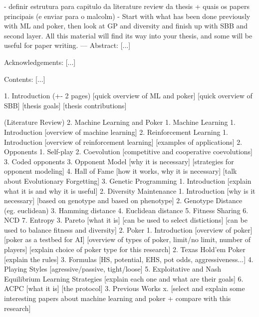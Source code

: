 - definir estrutura para capitulo da literature review da thesis + quais os papers principais (e enviar para o malcolm)
    - Start with what has been done previously with ML and poker, then look at GP and diversity and finish up with SBB and second layer. All this material will find its way into your thesis, and some will be useful for paper writing.
---
Abstract:
[...]

Acknowledgements:
[...]

Contents:
[...]

1. Introduction (+- 2 pages)
    [quick overview of ML and poker]
    [quick overview of SBB]
    [thesis goals]
    [thesis contributions]

(Literature Review)
2. Machine Learning and Poker
    1. Machine Learning
        1. Introduction
            [overview of machine learning]
        2. Reinforcement Learning
            1. Introduction
                [overview of reinforcement learning]
                [examples of applications]
            2. Opponents
                1. Self-play
                2. Coevolution
                    [competitive and cooperative coevolutions]
                3. Coded opponents
            3. Opponent Model
                [why it is necessary]
                [strategies for opponent modeling]
            4. Hall of Fame
                [how it works, why it is necessary]
                [talk about Evolutionary Forgetting]
        3. Genetic Programming
            1. Introduction
                [explain what it is and why it is useful]
            2. Diversity Maintenance
                1. Introduction
                    [why is it necessary]
                    [based on genotype and based on phenotype]
                2. Genotype Distance (eg. euclidean) 
                3. Hamming distance
                4. Euclidean distance
                5. Fitness Sharing
                6. NCD
                7. Entropy
            3. Pareto
                [what it is]
                [can be used to select distictions]
                [can be used to balance fitness and diversity]
    2. Poker
        1. Introduction
            [overview of poker]
            [poker as a testbed for AI]
            [overview of types of poker, limit/no limit, number of players]
            [explain choice of poker type for this research]
        2. Texas Hold’em Poker
            [explain the rules]
        3. Formulas
            [HS, potential, EHS, pot odds, aggressiveness...]
        4. Playing Styles
            [agressive/passive, tight/loose]
        5. Exploitative and Nash Equilibrium Learning Strategies
            [explain each one and what are their goals]
        6. ACPC
            [what it is]
            [the protocol]
    3. Previous Works
        x. [select and explain some interesting papers about machine learning and poker + compare with this research]


